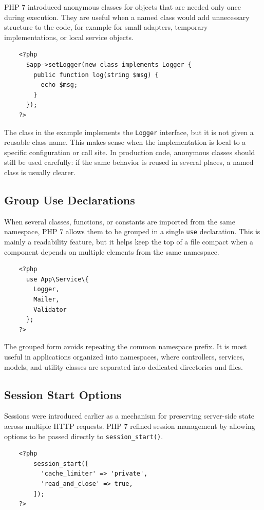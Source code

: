 \documentclass{scrbook}
\begin{document}
	PHP 7 introduced anonymous classes for objects that are needed only once during execution. They are useful when a named class would add unnecessary structure to the code, for example for small adapters, temporary implementations, or local service objects.
	
	\begin{lstlisting}
	<?php
	  $app->setLogger(new class implements Logger {
		public function log(string $msg) {
		  echo $msg;
		}
	  });
	?>
	\end{lstlisting}
	
	The class in the example implements the \texttt{Logger} interface, but it is not given a reusable class name. This makes sense when the implementation is local to a specific configuration or call site. In production code, anonymous classes should still be used carefully: if the same behavior is reused in several places, a named class is usually clearer.
	
	\subsection{Group Use Declarations}
	
	When several classes, functions, or constants are imported from the same namespace, PHP 7 allows them to be grouped in a single \texttt{use} declaration. This is mainly a readability feature, but it helps keep the top of a file compact when a component depends on multiple elements from the same namespace.
	
	\begin{lstlisting}
	<?php
	  use App\Service\{
		Logger,
		Mailer,
		Validator
	  };
	?>
	\end{lstlisting}
	
	The grouped form avoids repeating the common namespace prefix. It is most useful in applications organized into namespaces, where controllers, services, models, and utility classes are separated into dedicated directories and files.
	
	\subsection{Session Start Options}
	
	Sessions were introduced earlier as a mechanism for preserving server-side state across multiple HTTP requests. PHP 7 refined session management by allowing options to be passed directly to \texttt{session\_start()}.
	
	\begin{lstlisting}
	<?php
		session_start([
		  'cache_limiter' => 'private',
		  'read_and_close' => true,
		]);
	?>
	\end{lstlisting}
	
\end{document}
